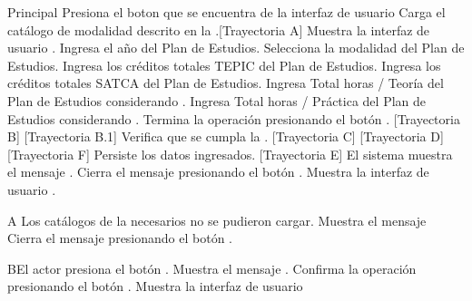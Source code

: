 \begin{UCtrayectoria}{Principal}
    \UCpaso[\UCactor] Presiona el boton \IUbutton{+} que se encuentra de la interfaz de usuario 
    \UCpaso Carga el catálogo de modalidad descrito en la .[Trayectoria A]
    \UCpaso Muestra la interfaz de usuario .
    \UCpaso[\UCactor] Ingresa el año del Plan de Estudios.
    \UCpaso[\UCactor] Selecciona la modalidad del Plan de Estudios.
    \UCpaso[\UCactor] Ingresa los créditos totales TEPIC del Plan de Estudios.
    \UCpaso[\UCactor] Ingresa los créditos totales SATCA del Plan de Estudios.
    \UCpaso[\UCactor] Ingresa Total horas / Teoría del Plan de Estudios considerando .
    \UCpaso[\UCactor] Ingresa Total horas / Práctica del Plan de Estudios  considerando .
    \UCpaso[\UCactor] Termina la operación presionando el botón . [Trayectoria B] [Trayectoria B.1]
    \UCpaso Verifica que se cumpla la . [Trayectoria C] [Trayectoria D] [Trayectoria F]
    \UCpaso Persiste los datos ingresados. [Trayectoria E]
    \UCpaso El sistema muestra el mensaje .
    \UCpaso[\UCactor] Cierra el mensaje presionando el botón .
    \UCpaso Muestra la interfaz de usuario .
\end{UCtrayectoria}
\begin{UCtrayectoriaA}{A}{ Los catálogos de la  necesarios no se pudieron cargar.}
	\UCpaso Muestra el mensaje 
	\UCpaso[\UCactor] Cierra el mensaje presionando el botón .
\end{UCtrayectoriaA}

\begin{UCtrayectoriaA}{B}{El actor presiona el botón .}
	\UCpaso Muestra el mensaje .
	\UCpaso[\UCactor] Confirma la operación presionando el botón .
	\UCpaso Muestra la interfaz de usuario 
\end{UCtrayectoriaA}

